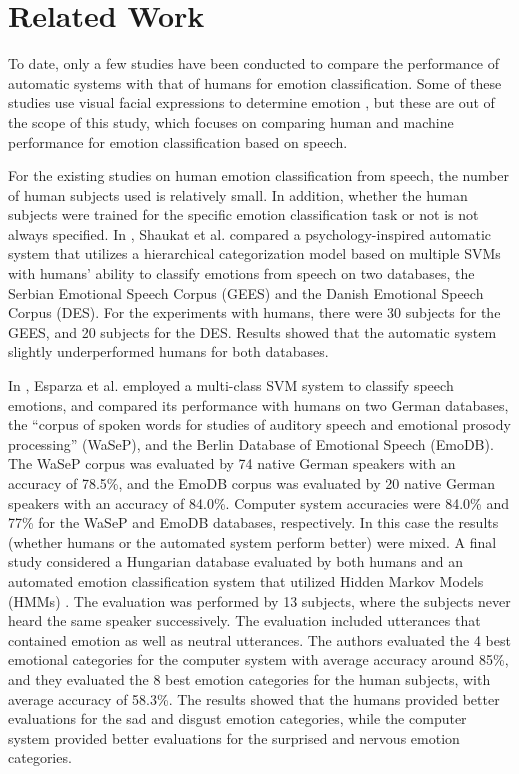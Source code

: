 \documentclass{article}
\begin{document}
\section{Related Work} \label{Related Work}
To date, only a few studies have been conducted to compare the performance of automatic systems with that of humans for emotion classification. Some of these studies use visual facial expressions to determine emotion \cite{holkamp2014comparison,janssen2013machines, susskind2007human}, but these are out of the scope of this study, which focuses on comparing human and machine performance for emotion classification based on speech. \par
For the existing studies on human emotion classification from speech, the number of human subjects used is relatively small. In addition, whether the human subjects were trained for the specific emotion classification task or not is not always specified. 
In \cite{shaukat2010emotional}, Shaukat et al. compared a psychology-inspired automatic system that utilizes a hierarchical categorization model based on multiple SVMs with humans' ability to classify emotions from speech on two databases, the Serbian Emotional Speech Corpus (GEES) and the Danish Emotional Speech Corpus (DES). For the experiments with humans, there were 30 subjects for the GEES, and 20 subjects for the DES. Results showed that the automatic system slightly underperformed humans for both databases. \par
In \cite{esparza2012automatic}, Esparza et al. employed a multi-class SVM system to classify speech emotions, and compared its performance with humans on two German databases, the ``corpus of spoken words for studies of auditory speech and emotional prosody processing'' (WaSeP), and the Berlin Database of Emotional Speech (EmoDB). The WaSeP corpus was evaluated by 74 native German speakers with an accuracy of 78.5\%, and the EmoDB corpus was evaluated by 20 native German speakers with an accuracy of 84.0\%. Computer system accuracies were 84.0\% and 77\% for the WaSeP and EmoDB databases, respectively. In this case the results (whether humans or the automated system perform better) were mixed.
A final study considered a Hungarian database evaluated by both humans and an automated emotion classification system that utilized Hidden Markov Models (HMMs) \cite{toth2008speech}. The evaluation was performed by 13 subjects, where the subjects never heard the same speaker successively. The evaluation included utterances that contained emotion as well as neutral utterances. The authors evaluated the 4 best emotional categories for the computer system with average accuracy around 85\%, and they evaluated the 8 best emotion categories for the human subjects, with average accuracy of 58.3\%. The results showed that the humans provided better evaluations for the sad and disgust emotion categories, while the computer system provided better evaluations for the surprised and nervous emotion categories. \par
\end{document}
